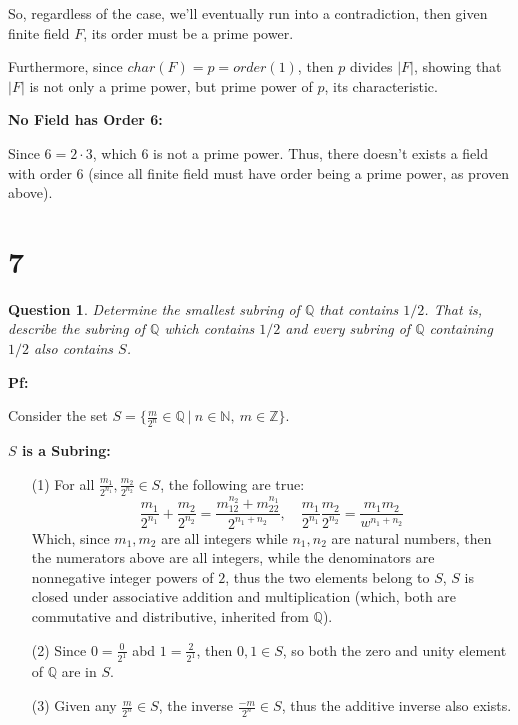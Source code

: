 \documentclass{article}
\newtheorem{question}{Question}
\begin{document}
\hfill

So, regardless of the case, we'll eventually run into a contradiction, then given finite field $F$, its order must be a prime power.

Furthermore, since $char(F)=p=order(1)$, then $p$ divides $|F|$, showing that $|F|$ is not only a prime power, but prime power of $p$, its characteristic.

\hfill

\hfill

\textbf{No Field has Order 6:}

Since $6=2\cdot 3$, which $6$ is not a prime power. Thus, there doesn't exists a field with order $6$ (since all finite field must have order being a prime power, as proven above).




\break


\section*{7}
\begin{myBox}[]{}
    \begin{question}
        Determine the smallest subring of $\mathbb{Q}$ that contains $1/2$. That is, describe the subring
        of $\mathbb{Q}$ which contains $1/2$ and every subring of $\mathbb{Q}$ containing $1/2$ also contains $S$.
    \end{question}
\end{myBox}

\textbf{Pf:}

Consider the set $S=\{\frac{m}{2^n}\in\mathbb{Q}\ |\ n\in\mathbb{N},\ m\in\mathbb{Z}\}$.

\hfill

\textbf{$S$ is a Subring:}
\begin{itemize}
    \item[(1)] For all $\frac{m_1}{2^{n_1}},\frac{m_2}{2^{n_2}}\in S$, the following are true:
    $$\frac{m_1}{2^{n_1}}+\frac{m_2}{2^{n_2}}=\frac{m_12^{n_2}+m_22^{n_1}}{2^{n_1+n_2}},\quad \frac{m_1}{2^{n_1}}\frac{m_2}{2^{n_2}}=\frac{m_1m_2}{w^{n_1+n_2}}$$
    Which, since $m_1,m_2$ are all integers while $n_1,n_2$ are natural numbers, then the numerators above are all integers, while the denominators are nonnegative integer powers of $2$,
    thus the two elements belong to $S$, $S$ is closed under associative addition and multiplication (which, both are commutative and distributive, inherited from $\mathbb{Q}$).

    \hfill

    \item[(2)] Since $0 = \frac{0}{2^1}$ abd $1=\frac{2}{2^1}$, then $0,1\in S$, so both the zero and unity element of $\mathbb{Q}$ are in $S$.
    
    \hfill

    \item[(3)] Given any $\frac{m}{2^n}\in S$, the inverse $\frac{-m}{2^n}\in S$, thus the additive inverse also exists.
\end{itemize}
\end{document}
